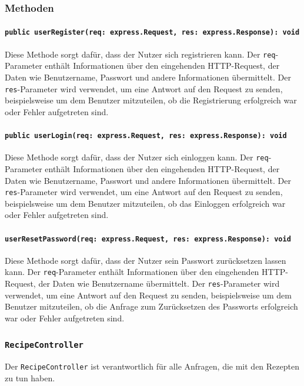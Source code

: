 \documentclass{entwurfsheft}
\begin{document}
\subsubsection*{Methoden}
\paragraph{\texttt{public userRegister(req: express.Request, res: express.Response): void}}

Diese Methode sorgt dafür, dass der Nutzer sich registrieren kann. Der \texttt{req}-Parameter enthält Informationen über den eingehenden HTTP-Request, der Daten wie Benutzername, Passwort und andere Informationen übermittelt. Der \texttt{res}-Parameter wird verwendet, um eine Antwort auf den Request zu senden, beispielsweise um dem Benutzer mitzuteilen, ob die Registrierung erfolgreich war oder Fehler aufgetreten sind.
\paragraph{\texttt{public userLogin(req: express.Request, res: express.Response): void}}
Diese Methode sorgt dafür, dass der Nutzer sich einloggen kann. Der \texttt{req}-Parameter enthält Informationen über den eingehenden HTTP-Request, der Daten wie Benutzername, Passwort und andere Informationen übermittelt. Der \texttt{res}-Parameter wird verwendet, um eine Antwort auf den Request zu senden, beispielsweise um dem Benutzer mitzuteilen, ob das Einloggen erfolgreich war oder Fehler aufgetreten sind. 
\paragraph{\texttt{userResetPassword(req: express.Request, res: express.Response): void}}
Diese Methode sorgt dafür, dass der Nutzer sein Passwort zurücksetzen lassen kann. Der \texttt{req}-Parameter enthält Informationen über den eingehenden HTTP-Request, der Daten wie Benutzername übermittelt. Der \texttt{res}-Parameter wird verwendet, um eine Antwort auf den Request zu senden, beispielsweise um dem Benutzer mitzuteilen, ob die Anfrage zum Zurücksetzen des Passworts erfolgreich war oder Fehler aufgetreten sind. 

\subsubsection{\texttt{RecipeController}}\label{sec:RecipeController}
Der \texttt{RecipeController} ist verantwortlich für alle Anfragen, die mit den Rezepten zu tun haben.
\end{document}
